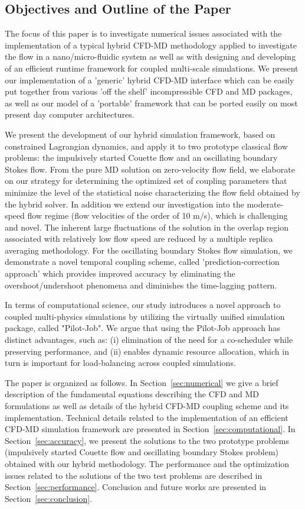 \documentclass[preprint,12pt]{elsarticle}
\begin{document}
\subsection{Objectives and Outline of the Paper}
\label{sec:intro_contents}

The focus of this paper is to investigate numerical issues associated with the implementation of a typical hybrid CFD-MD methodology applied to investigate the flow in a nano/micro-fluidic system as well as with designing and developing of an efficient runtime framework for coupled multi-scale simulations. We present our implementation of a 'generic' hybrid CFD-MD interface which can be easily put together from various 'off the shelf' incompressible CFD and MD packages, as well as our model of a 'portable' framework that can be ported easily on most present day computer architectures. 

We present the development of our hybrid simulation framework, based on constrained Lagrangian dynamics, and apply it to two prototype classical flow problems: the impulsively started Couette flow and an oscillating boundary Stokes flow.
From the pure MD solution on zero-velocity flow field, we elaborate on our strategy for determining the optimized set of coupling parameters that minimize the level of the statistical noise characterizing the flow field obtained by the hybrid solver. 
In addition we extend our investigation into the moderate-speed flow regime (flow velocities of the order of 10 m/s), which is challenging and novel. The inherent large fluctuations of the solution in the overlap region associated with relatively low flow speed are reduced by a multiple replica averaging methodology. For the oscillating boundary Stokes flow simulation, we demonstrate a novel temporal coupling scheme, called 'prediction-correction approach' which provides improved accuracy by eliminating the overshoot/undershoot phenomena and diminishes the time-lagging pattern.

In terms of computational science, our study introduces a novel approach to coupled multi-physics simulations by utilizing the virtually unified simulation package, called "Pilot-Job". We argue that using the Pilot-Job approach has distinct advantages, such as: (i) elimination of the need for a co-scheduler while preserving performance, and (ii) enables dynamic resource allocation, which in turn is important for load-balancing across coupled simulations. 

The paper is organized as follows. In Section~\ref{sec:numerical} we give a brief description of the fundamental equations describing the CFD and MD formulations as well as details of the hybrid CFD-MD coupling scheme and its implementation. Technical details related to the implementation of an efficient CFD-MD simulation framework are presented in Section~\ref{sec:computational}. In Section~\ref{sec:accuracy}, we present the solutions to the two prototype problems (impulsively started Couette flow and oscillating boundary Stokes problem) obtained with our hybrid methodology. The performance and the optimization issues related to the solutions of the two test problems are described in Section~\ref{sec:performance}. Conclusion and future works are presented in Section~\ref{sec:conclusion}.
\end{document}
